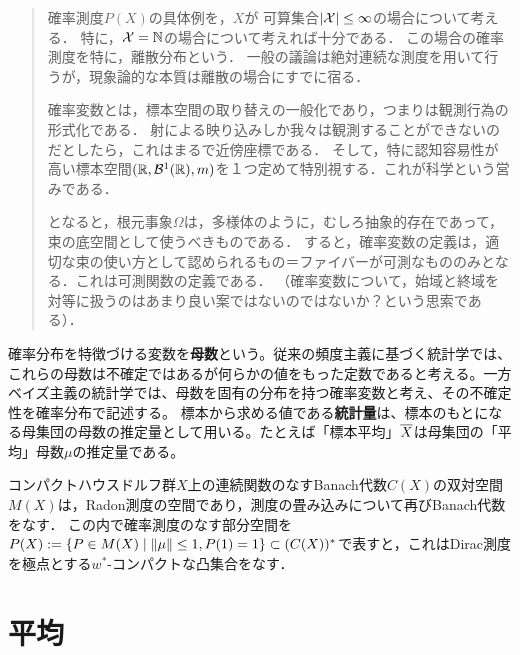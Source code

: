 \documentclass[uplatex,dvipdfmx]{jsreport}
\begin{document}
\begin{quotation}
    確率測度$P(X)$の具体例を，$X$が
    可算集合$\lvert\mathcal{X}\rvert\le\infty$の場合について考える．
    特に，$\mathcal{X}=\mathbb{N}$の場合について考えれば十分である．
    この場合の確率測度を特に，離散分布という．
    一般の議論は絶対連続な測度を用いて行うが，現象論的な本質は離散の場合にすでに宿る．

    確率変数とは，標本空間の取り替えの一般化であり，つまりは観測行為の形式化である．
    射による映り込みしか我々は観測することができないのだとしたら，これはまるで近傍座標である．
    そして，特に認知容易性が高い標本空間$(\mathbb{R},\mathcal{B}^1(\mathbb{R}),m)$を１つ定めて特別視する．これが科学という営みである．
    
    となると，根元事象$\Omega$は，多様体のように，むしろ抽象的存在であって，束の底空間として使うべきものである．
    すると，確率変数の定義は，適切な束の使い方として認められるもの＝ファイバーが可測なもののみとなる．これは可測関数の定義である．
    （確率変数について，始域と終域を対等に扱うのはあまり良い案ではないのではないか？という思索である）．
\end{quotation}

\begin{remark*}[statistics]
    確率分布を特徴づける変数を\textbf{母数}という。従来の頻度主義に基づく統計学では、これらの母数は不確定ではあるが何らかの値をもった定数であると考える。一方ベイズ主義の統計学では、母数を固有の分布を持つ確率変数と考え、その不確定性を確率分布で記述する。 
    標本から求める値である\textbf{統計量}は、標本のもとになる母集団の母数の推定量として用いる。たとえば「標本平均」$\overline{X}$は母集団の「平均」母数$\mu$の推定量である。
\end{remark*}

\begin{notation}
    コンパクトハウスドルフ群$X$上の連続関数のなすBanach代数$C(X)$の双対空間$M(X)$は，Radon測度の空間であり，測度の畳み込みについて再びBanach代数をなす．
    この内で確率測度のなす部分空間を$P(X):=\left\{P\in M(X)\mid \|\mu\|\le 1,P(1)=1\right\}\subset(C(X))^*$で表すと，これはDirac測度を極点とする$w^*$-コンパクトな凸集合をなす．
\end{notation}

\section{平均}
\end{document}
